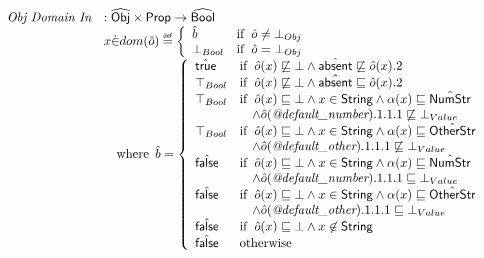 \[
\begin{array}{ll}
\textit{Obj Domain In} & : \widehat{\mbox{\textsf{Obj}}} \times \mbox{\textsf{Prop}} \rightarrow \widehat{\mbox{\textsf{Bool}}} \\
& x \dot{\in} dom(\hat{o}) \stackrel{\tiny \mbox{\textsf{def}}}{=}
  \left\{
    \begin{array}{ll}
      \hat{b} & {\rm if}\begin{array}[t]{l}\hat{o} \neq \bot_{Obj}\end{array} \\
      \bot_{Bool} & {\rm if}\begin{array}[t]{l}\hat{o} = \bot_{Obj}\end{array}
    \end{array}
  \right. \\
& \quad{\rm where}\begin{array}[t]{l}
  \hat{b} = 
    \left\{
      \begin{array}{ll}
        \hat{\mbox{\textsf{true}}}
        &{\rm if}\begin{array}[t]{l}\hat{o}(x)\not\sqsubseteq\bot \land \hat{\mbox{\textsf{absent}}}\not\sqsubseteq\hat{o}(x).2\end{array}\\
        \top_{Bool}
        &{\rm if}\begin{array}[t]{l}\hat{o}(x)\not\sqsubseteq\bot \land \hat{\mbox{\textsf{absent}}}\sqsubseteq\hat{o}(x).2\end{array}\\
        \top_{Bool}
        &{\rm if}\begin{array}[t]{l}\hat{o}(x)\sqsubseteq\bot \land x\in \mbox{\textsf{String}} \land \alpha(x) \sqsubseteq \hat{\mbox{\textsf{NumStr}}}\end{array}\\
        & \quad\land \hat{o}(\emph{@default\_number}).1.1.1 \not\sqsubseteq \bot_{Value} \\
        \top_{Bool}
        &{\rm if}\begin{array}[t]{l}\hat{o}(x)\sqsubseteq\bot \land x\in \mbox{\textsf{String}} \land \alpha(x) \sqsubseteq \hat{\mbox{\textsf{OtherStr}}}\end{array}\\
        & \quad\land \hat{o}(\emph{@default\_other}).1.1.1 \not\sqsubseteq \bot_{Value} \\
        \hat{\mbox{\textsf{false}}}
        &{\rm if}\begin{array}[t]{l}\hat{o}(x)\sqsubseteq\bot \land x\in \mbox{\textsf{String}} \land \alpha(x) \sqsubseteq \hat{\mbox{\textsf{NumStr}}}\end{array}\\
        & \quad\land \hat{o}(\emph{@default\_number}).1.1.1 \sqsubseteq \bot_{Value} \\
        \hat{\mbox{\textsf{false}}}
        &{\rm if}\begin{array}[t]{l}\hat{o}(x)\sqsubseteq\bot \land x\in \mbox{\textsf{String}} \land \alpha(x) \sqsubseteq \hat{\mbox{\textsf{OtherStr}}}\end{array}\\
        & \quad\land \hat{o}(\emph{@default\_other}).1.1.1 \sqsubseteq \bot_{Value} \\
        \hat{\mbox{\textsf{false}}}
        &{\rm if}\begin{array}[t]{l}\hat{o}(x)\sqsubseteq\bot \land x\not\in \mbox{\textsf{String}}\end{array}\\
        \hat{\mbox{\textsf{false}}}&{\rm otherwise}\\
      \end{array}
    \right.
\end{array}
\\\\


\end{array}\]
